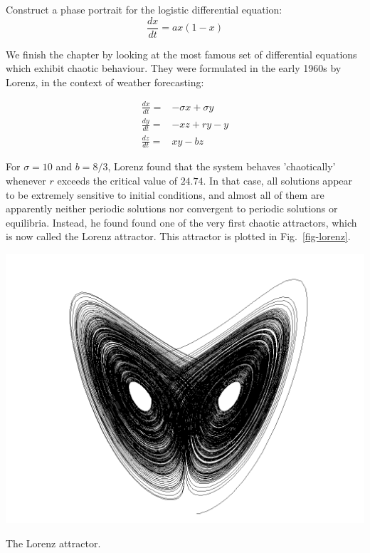\begin{exer}
Construct a phase portrait for the logistic differential equation:
$$\frac{dx}{dt} = a x (1-x)$$
\end{exer}

\pagebreak


We finish the chapter by looking at the most famous set of differential equations which exhibit chaotic behaviour. They were formulated in the early 1960s by Lorenz, in the context of weather forecasting:

\begin{align}
\frac{dx}{dt} =& -\sigma x + \sigma y \\
\frac{dy}{dt} =& -xz + r y - y \\
\frac{dz}{dt} =& xy - bz
\end{align} 

For $\sigma=10$ and $b=8/3$, Lorenz found that the system behaves 'chaotically' whenever $r$ exceeds the critical value of $24.74$. In that case, all solutions appear to be extremely sensitive to initial conditions, and almost all of them are apparently neither periodic solutions nor convergent to periodic solutions or equilibria. Instead, he found found one of the very first chaotic attractors, which is now called the Lorenz attractor. This attractor is plotted in Fig.~\ref{fig-lorenz}.

\begin{marginfigure}
\centering
\includegraphics{dynamic/figures/lorenz}
\caption{The Lorenz attractor.}
\label{fig-lorenz}
\end{marginfigure} 


